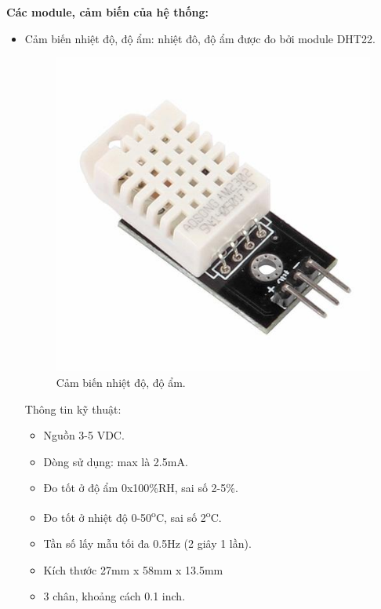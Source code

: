 \documentclass[a4paper,12pt,oneside]{article}
\begin{document}
\noindent \textbf{Các module, cảm biến của hệ thống:}
\begin{itemize}

\item Cảm biến nhiệt độ, độ ẩm: nhiệt đô, độ ẩm được đo bởi module DHT22.

\begin{figure}[H]
	\centering
	\includegraphics[scale=.3]{hinh/DHT22.jpg}
	\caption{Cảm biến nhiệt độ, độ ẩm\cite{dht22}.}
	\label{fig:DHT22}
\end{figure}


\noindent Thông tin kỹ thuật\cite{dht22}:
\begin{itemize}
\item Nguồn 3-5 VDC.
\item Dòng sử dụng: max là 2.5mA.
\item Đo tốt ở độ ẩm 0x100\%RH, sai số 2-5\%.
\item Đo tốt ở nhiệt độ 0-50\textsuperscript{o}C, sai số 2\textsuperscript{o}C.
\item Tần số lấy mẫu tối đa 0.5Hz (2 giây 1 lần).
\item Kích thước 27mm x 58mm x 13.5mm
\item 3 chân, khoảng cách 0.1 inch.
\end{itemize}


\end{itemize}
\end{document}
